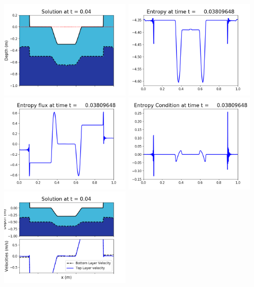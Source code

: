 \documentclass[11pt]{article}
\begin{document}
\includegraphics[width=0.475\textwidth]{frame0088fig1006.png}
\vskip 10pt 
\includegraphics[width=0.475\textwidth]{frame0088fig1007.png}
\includegraphics[width=0.475\textwidth]{frame0088fig1008.png}
\vskip 10pt 
\includegraphics[width=0.475\textwidth]{frame0088fig1009.png}
\vskip 10pt 
\includegraphics[width=0.475\textwidth]{frame0089fig1001.png}
\end{document}
